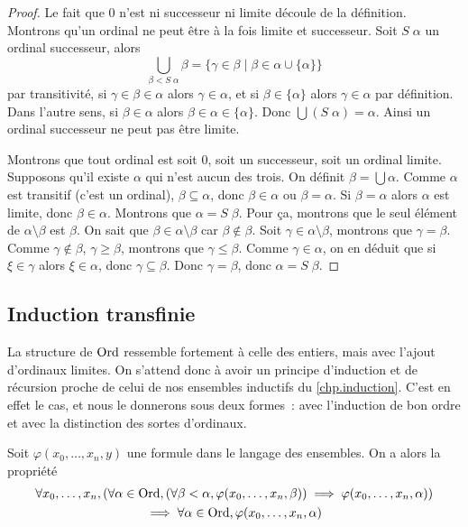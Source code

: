 \begin{proof}
  Le fait que $0$ n'est ni successeur ni limite découle de la définition.
  Montrons qu'un ordinal ne peut être à la fois limite et successeur. Soit
  $S\;\alpha$ un ordinal successeur, alors
  \[\bigcup_{\beta < S\;\alpha} \beta =
  \{\gamma \in \beta \mid \beta \in\alpha \cup \{\alpha\}\}\]
  par transitivité, si $\gamma\in\beta\in\alpha$ alors $\gamma\in \alpha$, et
  si $\beta \in\{\alpha\}$ alors $\gamma\in \alpha$ par définition. Dans l'autre
  sens, si $\beta \in \alpha$ alors $\beta\in\alpha\in\{\alpha\}$. Donc
  $\bigcup (S\;\alpha) = \alpha$. Ainsi un ordinal successeur ne peut pas être
  limite.

  Montrons que tout ordinal est soit $0$, soit un successeur, soit un ordinal
  limite. Supposons qu'il existe $\alpha$ qui n'est aucun des trois. On définit
  $\beta = \bigcup \alpha$. Comme $\alpha$ est transitif (c'est un ordinal),
  $\beta \subseteq \alpha$, donc $\beta \in \alpha$ ou $\beta = \alpha$.
  Si $\beta = \alpha$ alors $\alpha$ est limite, donc $\beta \in \alpha$.
  Montrons que $\alpha = S\;\beta$. Pour ça, montrons que le seul élément de
  $\alpha\setminus \beta$ est $\beta$. On sait que
  $\beta \in \alpha \setminus\beta$ car $\beta\notin\beta$. Soit
  $\gamma\in\alpha\setminus\beta$, montrons que $\gamma = \beta$.
  Comme $\gamma\notin\beta$, $\gamma \geq \beta$, montrons que
  $\gamma\leq\beta$. Comme $\gamma \in \alpha$, on en déduit que si
  $\xi\in\gamma$ alors $\xi \in \alpha$, donc $\gamma\subseteq \beta$. Donc
  $\gamma = \beta$, donc $\alpha = S\;\beta$.
\end{proof}

\subsection{Induction transfinie}

La structure de $\operatorname{Ord}$ ressemble fortement à celle des entiers, mais avec
l'ajout d'ordinaux limites. On s'attend donc à avoir un principe d'induction et
de récursion proche de celui de nos ensembles inductifs du \cref{chp.induction}.
C'est en effet le cas, et nous le donnerons sous deux formes~: avec l'induction
de bon ordre et avec la distinction des sortes d'ordinaux.

\begin{theorem}
  Soit $\varphi(x_0,\ldots,x_n,y)$ une formule dans le langage des ensembles.
  On a alors la propriété
  \begin{multline*}
    \forall x_0,\ldots,x_n,(\forall \alpha\in\operatorname{Ord},
    (\forall \beta < \alpha, \varphi(x_0,\ldots,x_n,\beta))\implies
    \varphi(x_0,\ldots,x_n,\alpha))\\
    \implies \forall \alpha \in \operatorname{Ord}, \varphi(x_0,\ldots,x_n,\alpha)
  \end{multline*}
\end{theorem}

